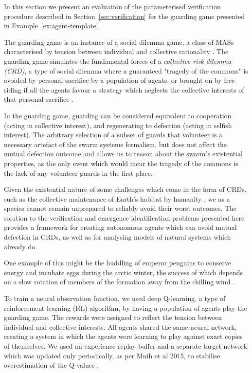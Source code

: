 
In this section we present an evaluation of the parameterised verification
procedure described in Section~\ref{sec:verification} for the guarding game
presented in Example~\ref{ex:agent-template}.


The guarding game is an instance of a social dilemma game, a class of
MASs characterised by tension between individual
and collective rationality \cite{VanlangeJPV13}. The guarding game simulates
the fundamental forces of a \emph{collective risk dilemma (CRD)}, a type of
social dilemma where a guaranteed "tragedy of the commons"
\cite{Hardin68} is avoided by personal sacrifice by a population of
agents, or brought on by free riding if all the agents favour a strategy which
neglects the collective interests of that personal sacrifice \cite{SantosP11}.

In the guarding game, guarding can be considered equivalent to cooperation
(acting in collective interest), and regenerating to defection (acting in
selfish interest). The arbitrary selection of a subset of guards that volunteer
is a necessary artefact of the swarm systems formalism, but does not affect the
mutual defection outcome and allows us to reason about the swarm's
existential properties, as the only event which would incur the tragedy of the
commons is the lack of any volunteer guards in the first place.

Given the existential nature of some challenges which come in the form of CRDs,
such as the collective maintenance of Earth's habitat by humanity
\cite{Smirnov19}, we as a species cannot remain unprepared to reliably avoid
their worst outcomes. The solution to the verification and
emergence identification problems presented here
provides a framework for creating autonomous agents which can avoid mutual
defection in CRDs, as well as for analysing models of natural systems which
already do.

One example of this might be the huddling of emperor penguins to conserve
energy and incubate eggs \cite{GilbertRLNA06,LeMaho1977} during the
arctic winter, the success of which depends on a slow rotation of members of
the formation away from the chilling wind \cite{WatersBK12}.

To train a neural observation function, we used deep Q-learning, a type of
reinforcement learning (RL) algorithm, by having a population of agents play
the guarding game. The rewards were assigned to
reflect the tension between individual and collective interests. All agents
shared the same neural network, creating a system in which the agents were
learning to play against exact copies of themselves. We
used an experience replay buffer and a separate target network which
was updated only periodically, as per Mnih et al 2015, to stabilise
overestimation of the Q-values \cite{Mnih+15,HaaseltGS16}.

